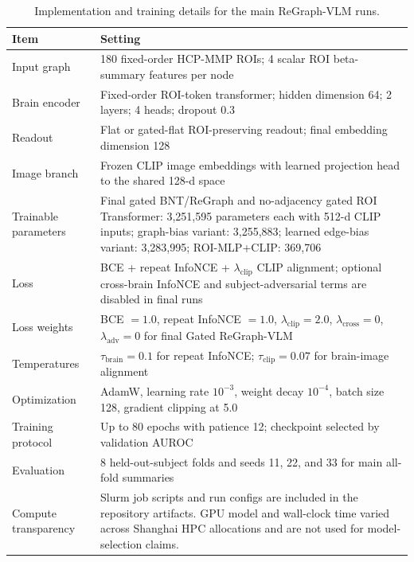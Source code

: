 \documentclass{article}
\begin{document}
\begin{table}[!htbp]
  \centering
  \caption{Implementation and training details for the main ReGraph-VLM runs.}
  \label{tab:implementation_details}
  \scriptsize
  \setlength{\tabcolsep}{5pt}
  \renewcommand{\arraystretch}{1.15}
  \begin{tabularx}{\linewidth}{lX}
    \toprule
    Item & Setting \\
    \midrule
    Input graph & 180 fixed-order HCP-MMP ROIs; 4 scalar ROI beta-summary features per node \\
    Brain encoder & Fixed-order ROI-token transformer; hidden dimension 64; 2 layers; 4 heads; dropout 0.3 \\
    Readout & Flat or gated-flat ROI-preserving readout; final embedding dimension 128 \\
    Image branch & Frozen CLIP image embeddings with learned projection head to the shared 128-d space \\
    Trainable parameters & Final gated BNT/ReGraph and no-adjacency gated ROI Transformer: 3,251,595 parameters each with 512-d CLIP inputs; graph-bias variant: 3,255,883; learned edge-bias variant: 3,283,995; ROI-MLP+CLIP: 369,706 \\
    Loss & BCE + repeat InfoNCE + $\lambda_{\mathrm{clip}}$ CLIP alignment; optional cross-brain InfoNCE and subject-adversarial terms are disabled in final runs \\
    Loss weights & BCE $=1.0$, repeat InfoNCE $=1.0$, $\lambda_{\mathrm{clip}}=2.0$, $\lambda_{\mathrm{cross}}=0$, $\lambda_{\mathrm{adv}}=0$ for final Gated ReGraph-VLM \\
    Temperatures & $\tau_{\mathrm{brain}}=0.1$ for repeat InfoNCE; $\tau_{\mathrm{clip}}=0.07$ for brain-image alignment \\
    Optimization & AdamW, learning rate $10^{-3}$, weight decay $10^{-4}$, batch size 128, gradient clipping at 5.0 \\
    Training protocol & Up to 80 epochs with patience 12; checkpoint selected by validation AUROC \\
    Evaluation & 8 held-out-subject folds and seeds 11, 22, and 33 for main all-fold summaries \\
    Compute transparency & Slurm job scripts and run configs are included in the repository artifacts. GPU model and wall-clock time varied across Shanghai HPC allocations and are not used for model-selection claims. \\
    \bottomrule
  \end{tabularx}
\end{table}
\end{document}
